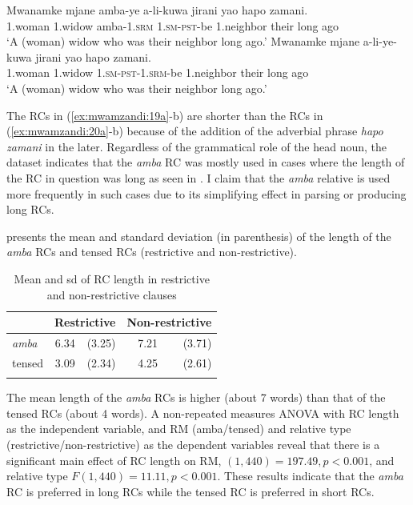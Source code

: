 \documentclass[output=paper,colorlinks,citecolor=brown]{langscibook}
\begin{document}
\ea%
    \label{ex:mwamzandi:20}
    \ea%
    \label{ex:mwamzandi:20a}
    \gll    Mwanamke mjane amba-ye a-li-kuwa jirani yao hapo zamani.\\
            1.woman  1.widow  amba\textsc{-1.srm} \textsc{1.sm-pst-}be 1.neighbor their long ago\\
    \glt    ‘A (woman) widow who was their neighbor long ago.’
    \ex%
    \label{ex:mwamzandi:20b}
    \gll    Mwanamke mjane a-li-ye-kuwa jirani yao hapo zamani.\\
            1.woman 1.widow \textsc{1.sm-pst-1.srm-}be 1.neighbor their long ago\\
    \glt    ‘A (woman) widow who was their neighbor long ago.’
    \z
\z

The RCs in (\ref{ex:mwamzandi:19a}-b) are shorter than the RCs in (\ref{ex:mwamzandi:20a}-b) because of the addition of the adverbial phrase \textit{hapo zamani} in the later. Regardless of the grammatical role of the head noun, the dataset indicates that the \textit{amba} RC was mostly used in cases where the length of the RC in question was long as seen in . I claim that the \textit{amba} relative is used more frequently in such cases due to its simplifying effect in parsing or producing long RCs.

 presents the mean and standard deviation (in parenthesis) of the length of the \textit{amba} RCs and tensed RCs (restrictive and non-restrictive).

\begin{table}
    \begin{tabularx}{.55\textwidth}{Xrrrr} 
    \lsptoprule
    & \multicolumn{2}{l}{Restrictive} & \multicolumn{2}{l}{Non-restrictive}\\
    \midrule
    \textit{amba} & 6.34 & (3.25) & 7.21 & (3.71)\\
    tensed & 3.09 & (2.34) & 4.25 & (2.61)\\
    \lspbottomrule
    \end{tabularx}
    \caption{Mean and sd of RC length in restrictive and non-restrictive clauses}
    \label{tab:mwamzandi:1}
\end{table}

The mean length of the \textit{amba} RCs is higher (about 7 words) than that of the tensed RCs (about 4 words). A non-repeated measures ANOVA with RC length as the independent variable, and RM (amba/tensed) and relative type (restrictive\slash non-restrictive) as the dependent variables reveal that there is a significant main effect of RC length on RM, $(1,440)=197.49, p<0.001$, and relative type $F(1,440)=11.11, p<0.001$. These results indicate that the \textit{amba} RC is preferred in long RCs while the tensed RC is preferred in short RCs.
\end{document}
